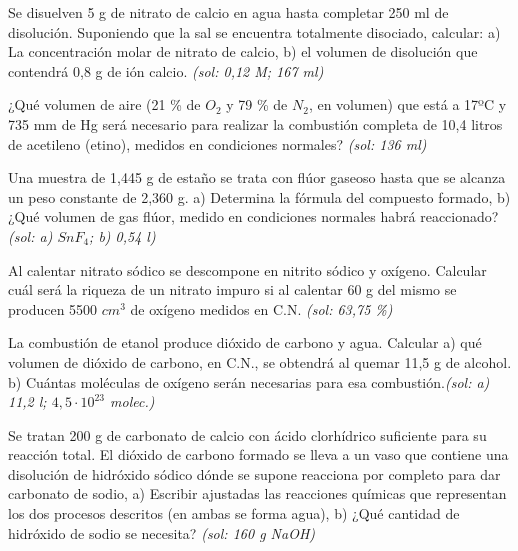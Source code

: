 \begin{multicols}{2}
\begin{problem}
\end{problem}
\begin{problem}
Se disuelven 5 g de nitrato de calcio en agua hasta completar 250 ml de disolución. Suponiendo que la sal se encuentra totalmente disociado, calcular: a) La concentración molar de nitrato de calcio, b) el volumen de disolución que contendrá 0,8 g de ión calcio. \textit{\scriptsize(sol: 0,12 M; 167 ml)}
\end{problem}
\begin{problem}
¿Qué volumen de aire (21 \% de $O_2$ y 79 \% de $N_2$, en volumen) que está a 17ºC y 735 mm de Hg será necesario para realizar la combustión completa de 10,4 litros de acetileno (etino), medidos en condiciones normales? \textit{\scriptsize(sol: 136 ml)}	
\end{problem}
\begin{problem}
Una muestra de 1,445 g de estaño se trata con flúor gaseoso hasta que se alcanza un peso constante de 2,360 g. a) Determina la fórmula del compuesto formado, b) ¿Qué volumen de gas flúor, medido en condiciones normales habrá reaccionado? \textit{\scriptsize(sol: a) $SnF_4$; b) 0,54 l)}
\end{problem}
\begin{problem}
Al calentar nitrato sódico se descompone en nitrito sódico y oxígeno. Calcular cuál será la riqueza de un nitrato impuro si al calentar 60 g del mismo se producen 5500 $cm^3$ de oxígeno medidos en C.N. \textit{\scriptsize(sol: 63,75 \%)}
\end{problem}
\begin{problem}
La combustión de etanol produce dióxido de carbono y agua. Calcular a) qué volumen de dióxido de carbono, en C.N., se obtendrá al quemar 11,5 g de alcohol. b) Cuántas moléculas de oxígeno serán necesarias para esa combustión.\textit{\scriptsize(sol: a) 11,2 l; $4,5\cdot 10^{23}$ molec.)}	
\end{problem}
\begin{problem}
Se tratan 200 g de carbonato de calcio con ácido clorhídrico suficiente para su reacción total. El dióxido de carbono formado se lleva a un vaso que contiene una disolución de hidróxido sódico dónde se supone reacciona por completo para dar carbonato de sodio, a) Escribir ajustadas las reacciones químicas que representan los dos procesos descritos (en ambas se forma agua), b) ¿Qué cantidad de hidróxido de sodio se necesita? \textit{\scriptsize(sol: 160 g NaOH)}	
\end{problem}
\begin{problem}

\end{problem}
\end{multicols}
